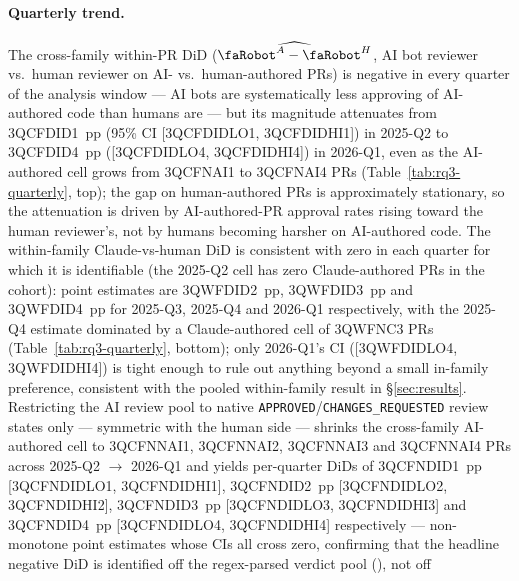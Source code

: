 
\paragraph{Quarterly trend.} The cross-family within-PR DiD ($\widehat{\rbt^A - \rbt^H}$, AI bot reviewer vs.\ human reviewer on AI- vs.\ human-authored PRs) is negative in every quarter of the analysis window --- AI bots are systematically less approving of AI-authored code than humans are --- but its magnitude attenuates from \PLACEHOLDERRQ3QCFDID1{}~pp (95\% CI [\PLACEHOLDERRQ3QCFDIDLO1{}, \PLACEHOLDERRQ3QCFDIDHI1{}]) in 2025-Q2 to \PLACEHOLDERRQ3QCFDID4{}~pp ([\PLACEHOLDERRQ3QCFDIDLO4{}, \PLACEHOLDERRQ3QCFDIDHI4{}]) in 2026-Q1, even as the AI-authored cell grows from \PLACEHOLDERRQ3QCFNAI1{} to \PLACEHOLDERRQ3QCFNAI4{} PRs (Table~\ref{tab:rq3-quarterly}, top); the gap on human-authored PRs is approximately stationary, so the attenuation is driven by AI-authored-PR approval rates rising toward the human reviewer's, not by humans becoming harsher on AI-authored code. The within-family Claude-vs-human DiD is consistent with zero in each quarter for which it is identifiable (the 2025-Q2 cell has zero Claude-authored PRs in the cohort): point estimates are \PLACEHOLDERRQ3QWFDID2{}~pp, \PLACEHOLDERRQ3QWFDID3{}~pp and \PLACEHOLDERRQ3QWFDID4{}~pp for 2025-Q3, 2025-Q4 and 2026-Q1 respectively, with the 2025-Q4 estimate dominated by a Claude-authored cell of \PLACEHOLDERRQ3QWFNC3{} PRs (Table~\ref{tab:rq3-quarterly}, bottom); only 2026-Q1's CI ([\PLACEHOLDERRQ3QWFDIDLO4{}, \PLACEHOLDERRQ3QWFDIDHI4{}]) is tight enough to rule out anything beyond a small in-family preference, consistent with the pooled within-family result in \S\ref{sec:results}. Restricting the AI review pool to native \texttt{APPROVED}/\texttt{CHANGES\_REQUESTED} review states only --- symmetric with the human side --- shrinks the cross-family AI-authored cell to \PLACEHOLDERRQ3QCFNNAI1{}, \PLACEHOLDERRQ3QCFNNAI2{}, \PLACEHOLDERRQ3QCFNNAI3{} and \PLACEHOLDERRQ3QCFNNAI4{} PRs across 2025-Q2 $\to$ 2026-Q1 and yields per-quarter DiDs of \PLACEHOLDERRQ3QCFNDID1{}~pp [\PLACEHOLDERRQ3QCFNDIDLO1{}, \PLACEHOLDERRQ3QCFNDIDHI1{}], \PLACEHOLDERRQ3QCFNDID2{}~pp [\PLACEHOLDERRQ3QCFNDIDLO2{}, \PLACEHOLDERRQ3QCFNDIDHI2{}], \PLACEHOLDERRQ3QCFNDID3{}~pp [\PLACEHOLDERRQ3QCFNDIDLO3{}, \PLACEHOLDERRQ3QCFNDIDHI3{}] and \PLACEHOLDERRQ3QCFNDID4{}~pp [\PLACEHOLDERRQ3QCFNDIDLO4{}, \PLACEHOLDERRQ3QCFNDIDHI4{}] respectively --- non-monotone point estimates whose CIs all cross zero, confirming that the headline negative DiD is identified off the regex-parsed verdict pool (), not off 
